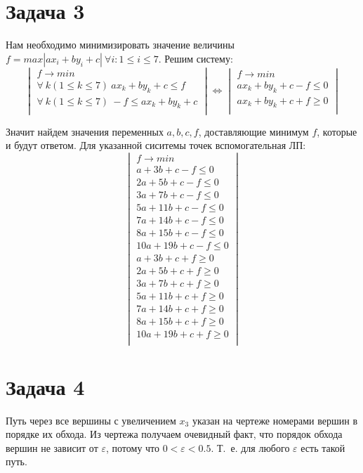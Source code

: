 \documentclass[a4paper,12pt]{article} %
\begin{document}
\section*{Задача 3}
Нам необходимо минимизировать значение величины $f = max|ax_i+by_i+c| ~\forall i:1\leq i \leq 7$. Решим систему:
\[
\begin{vmatrix}
f \rightarrow min\\
\forall~k(1\leq k \leq 7)~ax_k +by_k  +c \leq f\\
\forall~k(1\leq k \leq 7)~-f\leq ax_k +by_k  +c\\
\end{vmatrix}\Leftrightarrow
\begin{vmatrix}
f \rightarrow min\\
ax_k +by_k  +c-f \leq 0\\
ax_k +by_k  +c + f \geq 0	\\
\end{vmatrix}\]

Значит найдем значения переменных $a, b, c, f$, доставляющие минимум $f$, которые и будут ответом.
Для указанной сиситемы точек вспомогательная ЛП:
\[\begin{vmatrix}
f \rightarrow min\\
a + 3b  +c-f \leq 0\\
2a + 5b  +c-f \leq 0\\
3a + 7b  +c-f \leq 0\\
5a + 11b  +c-f \leq 0\\
7a + 14b  +c-f \leq 0\\
8a + 15b  +c-f \leq 0\\
10a + 19b  +c-f \leq 0\\
a + 3b  +c+f \geq 0\\
2a + 5b  +c+f \geq 0\\
3a + 7b  +c+f \geq 0\\
5a + 11b  +c+f \geq 0\\
7a + 14b  +c+f \geq 0\\
8a + 15b  +c+f \geq 0\\
10a + 19b  +c+f \geq 0\\
\end{vmatrix}\]
 

\section*{Задача 4}
Путь через все вершины с увеличением $x_3$ указан на чертеже номерами вершин в порядке их обхода. Из чертежа получаем очевидный факт, что порядок обхода вершин не зависит от $\varepsilon$, потому что $0 < \varepsilon < 0.5$. Т.~е. для любого $\varepsilon$ есть такой путь.\\
\end{document}
